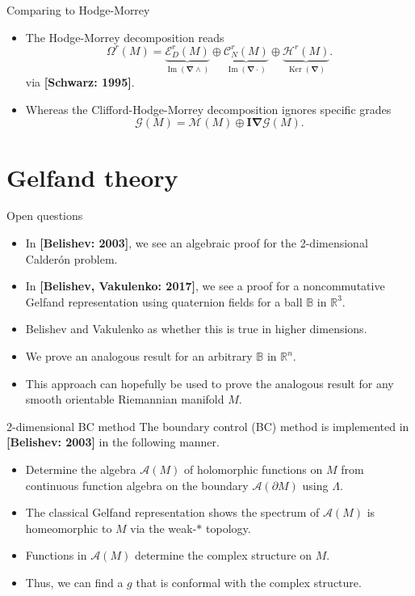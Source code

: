 \documentclass[aspectratio=169]{beamer}
\newcommand\boldgold[1]{\textcolor{csu_gold}{\textbf{#1}}}
\newcommand{\R}{\mathbb{R}}
\newcommand{\algebra}{\mathcal{A}}
\newcommand{\grad}{\boldsymbol{\nabla}}
\newcommand{\G}{\mathcal{G}}
\newcommand{\ball}{\mathbb{B}}
\newcommand{\blade}[1]{\boldsymbol{#1}}
\newcommand{\pseudoscalar}{\blade{I}}
\newcommand{\monogenicfields}[1]{\mathcal{M}^{#1}(M)}
\begin{document}
\begin{frame}{Comparing to Hodge-Morrey}
\vfill
\begin{itemize}
\pause
\item The Hodge-Morrey decomposition reads
\[
\Omega^r(M) = \underbrace{\mathcal{E}_D^r(M)}_{\operatorname{Im}(\grad \wedge)} \oplus \underbrace{\mathcal{C}_N^r(M)}_{\operatorname{Im}(\grad \cdot)} \oplus \underbrace{\mathcal{H}^r(M)}_{\operatorname{Ker}(\grad)}.
\]
via \boldgold{[Schwarz: 1995]}.
\pause 
\item Whereas the Clifford-Hodge-Morrey decomposition ignores specific grades
\[
\G(M) = \monogenicfields{} \oplus \pseudoscalar \grad \G(M).
\]
\end{itemize}
\vfill
\end{frame}

\section{Gelfand theory}

\begin{frame}{Open questions}
\vfill
\begin{itemize}
\pause
    \item In \boldgold{[Belishev: 2003]}, we see an algebraic proof for the 2-dimensional Calder\'on problem.
\pause
    \item In \boldgold{[Belishev, Vakulenko: 2017]}, we see a proof for a noncommutative Gelfand representation using quaternion fields for a ball $\ball$ in $\R^3$. 
\pause
    \item Belishev and Vakulenko as whether this is true in higher dimensions.
\pause
    \item We prove an analogous result for an arbitrary $\ball$ in $\R^n$.
\pause
    \item This approach can hopefully be used to prove the analogous result for any smooth orientable Riemannian manifold $M$.
\end{itemize}
\vfill
\end{frame}

\begin{frame}{2-dimensional BC method}
\vfill
The boundary control (BC) method is implemented in \boldgold{[Belishev: 2003]} in the following manner.
\begin{itemize}
    \pause
    \item Determine the algebra $\algebra{}(M)$ of holomorphic functions on $M$ from continuous function algebra on the boundary $\algebra{}(\partial M)$ using $\Lambda$.
    \pause
    \item The classical Gelfand representation shows the spectrum of $\algebra{}(M)$ is homeomorphic to $M$ via the weak-$\ast$ topology.
    \pause
    \item Functions in $\algebra{}(M)$ determine the complex structure on $M$.
    \pause
    \item Thus, we can find a $g$ that is conformal with the complex structure.
\end{itemize}
\vfill
\end{frame}
\end{document}
